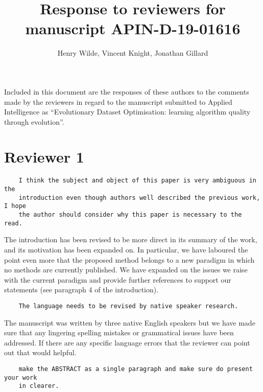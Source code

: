 \documentclass[11pt]{article}
\title{Response to reviewers for manuscript APIN-D-19-01616}
\author{Henry Wilde, Vincent Knight, Jonathan Gillard}
\date{}
\begin{document}
\maketitle%

Included in this document are the responses of these authors to the comments
made by the reviewers in regard to the manuscript submitted to Applied
Intelligence as ``Evolutionary Dataset Optimisation: learning algorithm quality
through evolution''.

\section*{Reviewer 1}

\begin{tcolorbox}
\begin{verbatim}
    I think the subject and object of this paper is very ambiguous in the
    introduction even though authors well described the previous work, I hope
    the author should consider why this paper is necessary to the read.
\end{verbatim}
\end{tcolorbox}

The introduction has been revised to be more direct in its summary of the work,
and its motivation has been expanded on. In particular, we have laboured the
point even more that the proposed method belongs to a new paradigm in which no
methods are currently published. We have expanded on the issues we raise with
the current paradigm and provide further references to support our statements
(see paragraph 4 of the introduction).\\

\begin{tcolorbox}
\begin{verbatim}
    The language needs to be revised by native speaker research.
\end{verbatim}
\end{tcolorbox}

The manuscript was written by three native English speakers but we have made
sure that any lingering spelling mistakes or grammatical issues have been
addressed. If there are any specific language errors that the reviewer can point
out that would helpful.\\

\begin{tcolorbox}
\begin{verbatim}
    make the ABSTRACT as a single paragraph and make sure do present your work
    in clearer.
\end{verbatim}
\end{tcolorbox}
\end{document}
